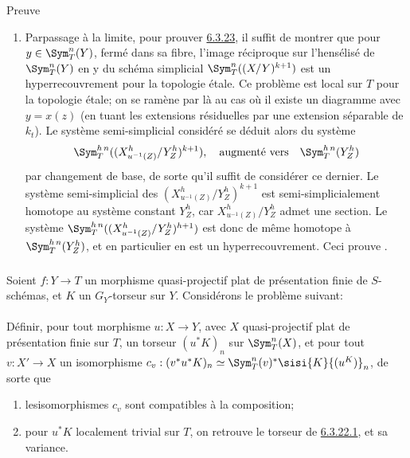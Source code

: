 \documentclass[10pt]{../fichiers-configuration-latex/smfart}
\begin{document}
\begin{enonce*}[remark]{Preuve}
\begin{enumerate}
\item Par\pageoriginale passage à la limite, pour prouver \hyperref[XVII.prop6.3.23]{6.3.23}, il
suffit de montrer que pour $y\in \Sym^{n}_{T}(Y)$, fermé dans sa
fibre, l'image réciproque sur l'hensélisé de $\Sym^{n}_{T}(Y)$ en y du
schéma simplicial $\Sym^{n}_{T}((X/Y)^{k+1})$ est un hyperrecouvrement
pour la topologie étale. Ce problème est local sur $T$ pour la
topologie étale; on se ramène par là au cas où il existe un diagramme
 avec $y=x(z)$ (en tuant les extensions résiduelles par une
extension séparable de $k_{t}$). Le système semi-simplicial considéré
se déduit alors du système
$$
\Sym^{h\,n}_{T}((X^{h}_{u^{-1}(Z)}/Y^{h}_{Z})^{k+1}),\quad\mbox{\rm
augmenté vers}\quad \Sym^{h\,n}_{T}(Y^{h}_{Z})
$$
par changement de base, de sorte qu'il suffit de considérer ce
dernier. Le système semi-simplicial des
$(X^{h}_{u^{-1}(Z)}/Y^{h}_{Z})^{k+1}$ est semi-simplicialement
homotope au système constant $Y^{h}_{Z}$, car
$X^{h}_{u^{-1}(Z)}/Y^{h}_{Z}$ admet une section. Le système
$\Sym^{h\,n}_{T}((X^{h}_{u^{-1}(Z)}/Y^{h}_{Z})^{h+1})$ est donc de même
homotope à $\Sym^{h\, n}_{T} (Y^{h}_{Z})$, et en particulier en est
un hyperrecouvrement. Ceci prouve .
\end{enumerate}
\end{enonce*}

\subsubsection{}
Soient $f:Y\rightarrow T$ un morphisme quasi-projectif plat de
présentation finie de $S$-schémas, et $K$ un $G_{Y}$-torseur sur
$Y$. Considérons le problème suivant:

\setcounter{paragraph}{-1}
\paragraph{}
Définir, pour tout morphisme $u:X\rightarrow Y$, avec $X$
quasi-projectif plat de présentation finie sur $T$, un torseur
$(u^{\ast}K)_{n}$ sur $\Sym^{n}_{T}(X)$, et pour tout $v:X'\rightarrow
X$ un isomorphisme $c_{v}:(v^{\ast}u^{\ast}K)_{n}\simeq
\Sym^{n}_{T}(v)^{\ast}\sisi{K}{(u^K)}_{n}$, de sorte que
\begin{enumerate}
\renewcommand{\theenumi}{\roman{enumi}}
\renewcommand{\labelenumi}{(\theenumi)}
\item les\pageoriginale isomorphismes $c_{v}$ sont compatibles à la
  composition;

\item pour $u^{\ast}K$ localement trivial sur $T$, on retrouve le
torseur de \hyperref[XVII.lem6.3.22.1]{6.3.22.1}, et sa variance.
\end{enumerate}
\end{document}
